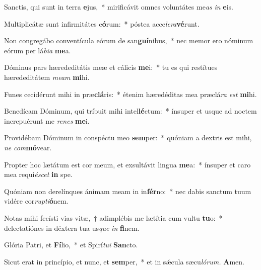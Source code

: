 \item Sanctis, qui sunt in terra \textbf{e}jus,~* mirificávit omnes voluntátes me\textit{as} \textit{in} \textbf{e}is.
\item Multiplicátæ sunt infirmitátes e\textbf{ó}rum:~* póstea acce\textit{lera}\textbf{vé}runt.
\item Non congregábo conventícula eórum de san\textbf{guí}nibus,~* nec memor ero nóminum eórum per lá\textit{bia} \textbf{me}a.
\item Dóminus pars hærededitátis meæ et cálicis \textbf{me}i:~* tu es qui restítues hærededitátem \textit{meam} \textbf{mi}hi.
\item Funes cecidérunt mihi in præ\textbf{clá}ris:~* étenim hæredéditas mea præclá\textit{ra} \textit{est} \textbf{mi}hi.
\item Benedícam Dóminum, qui tríbuit mihi intel\textbf{lé}ctum:~* ínsuper et usque ad noctem increpuérunt me \textit{renes} \textbf{me}i.
\item Providébam Dóminum in conspéctu meo \textbf{sem}per:~* quóniam a dextris est mihi, \textit{ne} \textit{com}\textbf{mó}vear.
\item Propter hoc lætátum est cor meum, et exsultávit lingua \textbf{me}a:~* ínsuper et caro mea requi\textit{éscet} \textbf{in} spe.
\item Quóniam non derelínques ánimam meam in in\textbf{fér}no:~* nec dabis sanctum tuum vidére cor\textit{rupti}\textbf{ó}nem.
\item Notas mihi fecísti vias vitæ,~† adimplébis me lætítia cum vultu \textbf{tu}o:~* delectatiónes in déxtera tua us\textit{que} \textit{in} \textbf{fi}nem.
\item Glória Patri, et \textbf{Fí}lio,~* et Spirí\tinyhspace\textit{tui} \textbf{San}cto.
\item Sicut erat in princípio, et nunc, et \textbf{sem}per,~* et in sǽcula sæcu\tinyhspace\textit{lórum.} \textbf{A}men.
